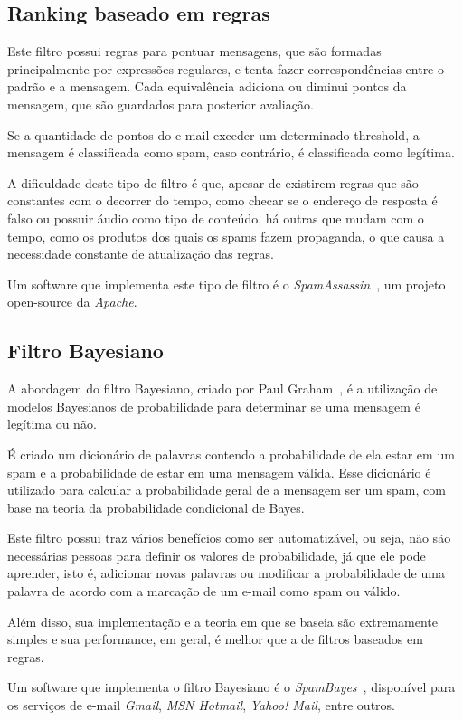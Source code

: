\documentclass[a4paper,dvipdfm]{article}
\begin{document}
	\subsection{Ranking baseado em regras}
		Este filtro possui regras para pontuar mensagens, que são formadas principalmente por expressões regulares, e tenta fazer correspondências entre o padrão e a mensagem.
		Cada equivalência adiciona ou diminui pontos da mensagem, que são guardados para posterior avaliação.
		
		Se a quantidade de pontos do e-mail exceder um determinado \gls{threshold}, a mensagem é classificada como spam, caso contrário, é classificada como legítima.

		A dificuldade deste tipo de filtro é que, apesar de existirem regras que são constantes com o decorrer do tempo, como checar se o endereço de resposta é falso ou possuir áudio como tipo de conteúdo, há outras que mudam com o tempo, como os produtos dos quais os spams fazem propaganda, o que causa a necessidade constante de atualização das regras.

		Um software que implementa este tipo de filtro é o \emph{SpamAssassin}~\cite{spamassassin}, um projeto open-source da \emph{Apache}.

	\subsection{Filtro Bayesiano}
		A abordagem do filtro Bayesiano, criado por Paul Graham~\cite{bayes:graham}, é a utilização de modelos Bayesianos de probabilidade para determinar se uma mensagem é legítima ou não.

		É criado um dicionário de palavras contendo a probabilidade de ela estar em um spam e a probabilidade de estar em uma mensagem válida. Esse dicionário é utilizado para calcular a probabilidade geral de a mensagem ser um spam, com base na teoria da probabilidade condicional de Bayes.

		Este filtro possui traz vários benefícios como ser automatizável, ou seja, não são necessárias pessoas para definir os valores de probabilidade, já que ele pode aprender, isto é, adicionar novas palavras ou modificar a probabilidade de uma palavra de acordo com a marcação de um e-mail como spam ou válido.

		Além disso, sua implementação e a teoria em que se baseia são extremamente simples e sua performance, em geral, é melhor que a de filtros baseados em regras.
		
		Um software que implementa o filtro Bayesiano é o \emph{SpamBayes}~\cite{spambayes}, disponível para os serviços de e-mail \emph{Gmail}, \emph{MSN Hotmail}, \emph{Yahoo! Mail}, entre outros.
\end{document}
